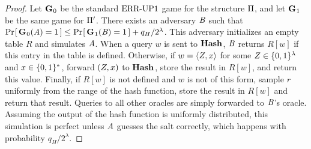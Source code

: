 \begin{proof}
Let $\mathbf{G}\hspace{0.5pt}_0$ be the standard $\textnormal{ERR\mbox{-}UP}1$ game for the structure $\mathrm{\Pi}$, and let $\mathbf{G}\hspace{0.5pt}_1$ be the same game for $\mathrm{\Pi}'$. There exists an adversary $\mathit{B}$ such that $\Pr\hspace{-1pt}\left[\,\mathbf{G}\hspace{0.5pt}_0(\mathit{A}) = 1\,\right] \le \Pr\hspace{-1pt}\left[\,\mathbf{G}\hspace{0.5pt}_1(\mathit{B}) = 1\,\right] + q_H/2^\lambda$. This adversary initializes an empty table $R$ and simulates $\mathit{A}$. When a query $w$ is sent to $\mathbf{Hash}\hspace{0.5pt}$, $\mathit{B}$ returns $R[w]$ if this entry in the table is defined. Otherwise, if $w = \langle Z, x\rangle$ for some $Z \in \{0,1\}^\lambda$ and $x \in \{0,1\}^*$, forward $(Z, x)$ to $\mathbf{Hash}\hspace{0.5pt}$, store the result in $R[w]$, and return this value. Finally, if $R[w]$ is not defined and $w$ is not of this form, sample $r$ uniformly from the range of the hash function, store the result in $R[w]$ and return that result. Queries to all other oracles are simply forwarded to $\mathit{B}$'s oracle. Assuming the output of the hash function is uniformly distributed, this simulation is perfect unless $\mathit{A}$ guesses the salt correctly, which happens with probability $q_H/2^\lambda$.\missingqed
\end{proof}

\begin{lemma}\label{lemma:keytorand}
\end{lemma}


